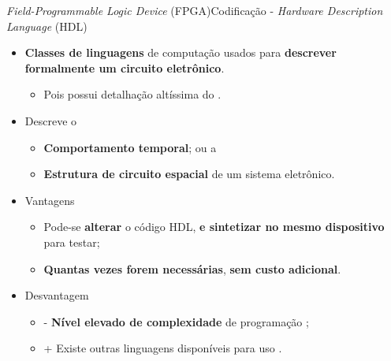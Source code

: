     \begin{frame}{\textit{Field-Programmable Logic Device} (FPGA)}{Codificação - \textit{Hardware Description Language} (HDL)} 
    \vspace{-1em}
    \begin{itemize}
        \setlength{\itemsep}{1.0em}
        \item \textbf{Classes de linguagens} de computação usados para \textbf{descrever formalmente um circuito eletrônico}.
        \begin{itemize}
            \item Pois possui detalhação altíssima do \hardware.
        \end{itemize} 
        
        \item Descreve o \cite{Sass2010}
        
        \begin{itemize}
            \item \textbf{Comportamento temporal}; ou a 
            \item \textbf{Estrutura de circuito espacial} de um sistema eletrônico.
        \end{itemize}
        
        \item Vantagens \cite{Smith1998}
        \begin{itemize}
            \item Pode-se \textbf{alterar} o código HDL, \textbf{e sintetizar no mesmo dispositivo} para testar;
            \item \textbf{Quantas vezes forem necessárias}, \textbf{sem custo adicional}.
        \end{itemize}
        
        \item Desvantagem
        \begin{itemize}
            \item - \textbf{Nível elevado de complexidade} de programação  \cite{Choi2016};
            \item + Existe outras linguagens disponíveis para uso \cite{Sass2010}. 
        \end{itemize}
    \end{itemize}
    \end{frame}
    
    
    
